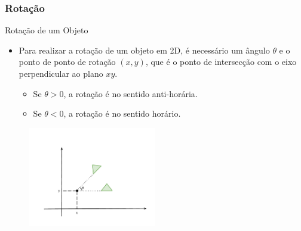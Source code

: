 \documentclass{beamer}
\begin{document}
\begin{frame}
\frametitle{Rotação}


	\begin{block}{Rotação de um Objeto}
		\begin{itemize}
			\item Para realizar a rotação de um objeto em 2D, é necessário um ângulo $\theta$ e o ponto de ponto de rotação $(x,y)$, que é o ponto de intersecção com o eixo perpendicular ao plano $xy$.
			\begin{itemize}
				\item Se $\theta > 0$, a rotação é no sentido anti-horária.
				\item Se $\theta < 0$, a rotação é no sentido horário.
			\end{itemize}
		\end{itemize}
	\end{block}
	
	\begin{figure}[!h]
			\begin{center}
			\includegraphics[width=0.5\textwidth]{Figures/ExemploRotacao}
			\end{center}
	\end{figure}
	
\end{frame}

\end{document}
